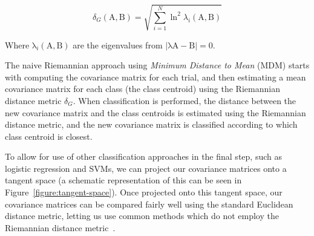         \[ \delta_G(\mathrm{A}, \mathrm{B}) = \sqrt{\sum_{i=1}^N \ln^2 \lambda_i (\mathrm{A}, \mathrm{B}) } \]

        Where $ \mathrm{\lambda}_i(\mathrm{A}, \mathrm{B}) $ are the eigenvalues from $|\mathrm{\lambda}\mathrm{A} - \mathrm{B}| = 0$.

        The naive Riemannian approach using \emph{Minimum Distance to Mean} (MDM) starts with computing the covariance matrix for each trial, and then estimating a mean covariance matrix for each class (the class centroid) using the Riemannian distance metric $\delta_G$. When classification is performed, the distance between the new covariance matrix and the class centroids is estimated using the Riemannian distance metric, and the new covariance matrix is classified according to which class centroid is closest.

        To allow for use of other classification approaches in the final step, such as logistic regression and SVMs, we can project our covariance matrices onto a tangent space (a schematic representation of this can be seen in Figure~\ref{figure:tangent-space}). Once projected onto this tangent space, our covariance matrices can be compared fairly well using the standard Euclidean distance metric, letting us use common methods which do not employ the Riemannian distance metric~\cite{congedo_riemannian_2017}.

        

